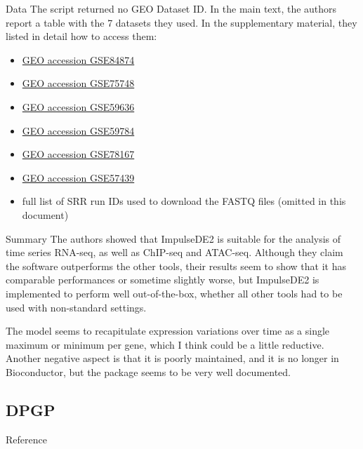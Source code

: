 \documentclass[10pt,a4paper]{article}
\newlength{\templength}
\newenvironment{ann_section}[1]
{\settowidth{\templength}{#1}%
\noindent\textbf{#1}
\hspace{1em}\begin{minipage}[t]{\dimexpr \linewidth-\the\templength-2em}}
{\end{minipage}\par\bigskip}
\begin{document}
\begin{ann_section}{Data}
The script returned no GEO Dataset ID. In the main text, the authors report a table with the 7 datasets they used. In the supplementary material, they listed in detail how to access them:
\begin{itemize}
    \item \href{https://www.ncbi.nlm.nih.gov/geo/query/acc.cgi?acc=GSE84874}{GEO accession GSE84874}
    \item \href{https://www.ncbi.nlm.nih.gov/geo/query/acc.cgi?acc=GSE75748}{GEO accession GSE75748}
    \item \href{https://www.ncbi.nlm.nih.gov/geo/query/acc.cgi?acc=GSE59636}{GEO accession GSE59636}
    \item \href{https://www.ncbi.nlm.nih.gov/geo/query/acc.cgi?acc=GSE59784}{GEO accession GSE59784}
    \item \href{https://www.ncbi.nlm.nih.gov/geo/query/acc.cgi?acc=GSE78167}{GEO accession GSE78167}
    \item \href{https://www.ncbi.nlm.nih.gov/geo/query/acc.cgi?acc=GSE57439}{GEO accession GSE57439}
    \item full list of SRR run IDs used to download the FASTQ files (omitted in this document) 
\end{itemize}
\end{ann_section}

\begin{ann_section}{Summary}
The authors showed that ImpulseDE2 is suitable for the analysis of time series RNA-seq, as well as ChIP-seq and ATAC-seq. Although they claim the software outperforms the other tools, their results seem to show that it has comparable performances or sometime slightly worse, but ImpulseDE2 is implemented to perform well out-of-the-box, whether all other tools had to be used with non-standard settings.

The model seems to recapitulate expression variations over time as a single maximum or minimum per gene, which I think could be a little reductive. Another negative aspect is that it is poorly maintained, and it is no longer in Bioconductor, but the package seems to be very well documented.
\end{ann_section}

\subsection{DPGP}
\begin{ann_section}{Reference}
\mbox{}
\end{ann_section}
\end{document}

